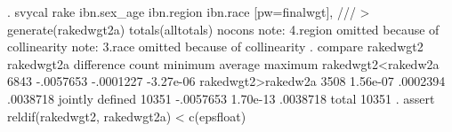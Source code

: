 . svycal rake ibn.sex_age ibn.region ibn.race [pw=finalwgt], ///
>         generate(rakedwgt2a) totals(alltotals) nocons
note: 4.region omitted because of collinearity
note: 3.race omitted because of collinearity
{\smallskip}
. compare rakedwgt2 rakedwgt2a
{\smallskip}
                                         difference 
                            count       minimum      average     maximum
rakedwgt2<rakedw{\tytilde}2a          6843     -.0057653    -.0001227   -3.27e-06
rakedwgt2>rakedw{\tytilde}2a          3508      1.56e-07     .0002394    .0038718
jointly defined             10351     -.0057653     1.70e-13    .0038718
total                       10351
{\smallskip}
. assert reldif(rakedwgt2, rakedwgt2a) < c(epsfloat)
{\smallskip}
